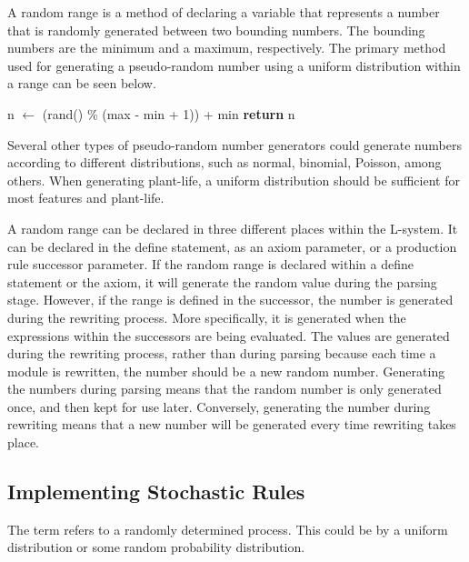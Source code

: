 A random range is a method of declaring a variable that represents a number that is randomly generated between two bounding numbers. The bounding numbers are the minimum and a maximum, respectively. The primary method used for generating a pseudo-random number using a uniform distribution within a range can be seen below. 

\begin{singlespace}
\begin{algorithm}
\begin{algorithmic}[1]
	\State n $\gets$ (rand() \% (max - min + 1)) + min
	\State \textbf{return} n
\EndProcedure
\end{algorithmic}
\end{algorithm}
\end{singlespace}

\noindent
Several other types of pseudo-random number generators could generate numbers according to different distributions, such as normal, binomial, Poisson, among others. When generating plant-life, a uniform distribution should be sufficient for most features and plant-life.

A random range can be declared in three different places within the L-system. It can be declared in the define statement, as an axiom parameter, or a production rule successor parameter. If the random range is declared within a define statement or the axiom, it will generate the random value during the parsing stage. However, if the range is defined in the successor, the number is generated during the rewriting process. More specifically, it is generated when the expressions within the successors are being evaluated. The values are generated during the rewriting process, rather than during parsing because each time a module is rewritten, the number should be a new random number. Generating the numbers during parsing means that the random number is only generated once, and then kept for use later. Conversely, generating the number during rewriting means that a new number will be generated every time rewriting takes place. 

\subsection{Implementing Stochastic Rules} \label{stochastic rules}

The term  refers to a randomly determined process. This could be by a uniform distribution or some random probability distribution. 

